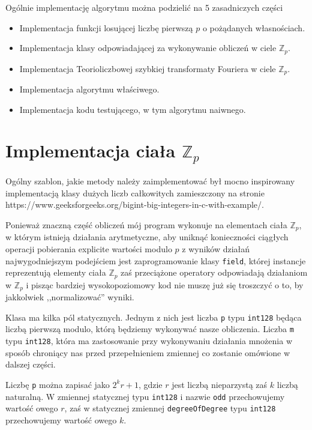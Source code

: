 \documentclass{article}
\begin{document}
Ogólnie implementację algorytmu można podzielić na 5 zasadniczych części
\begin{itemize}
  \item Implementacja funkcji losującej liczbę pierwszą $p$ o pożądanych własnościach.
  \item Implementacja klasy odpowiadającej za wykonywanie obliczeń w ciele $\mathbb{Z}_p$.
  \item Implementacja Teorioliczbowej szybkiej transformaty Fouriera w ciele $\mathbb{Z}_p$.
  \item Implementacja algorytmu właściwego.
  \item Implementacja kodu testującego, w tym algorytmu naiwnego.
\end{itemize}




\section{Implementacja ciała $ \mathbb{Z}_p$}

Ogólny szablon, jakie metody należy zaimplementować był 
mocno inspirowany implementacją klasy dużych liczb całkowitych
zamieszczony na stronie https://www.geeksforgeeks.org/bigint-big-integers-in-c-with-example/.


Ponieważ znaczną część obliczeń mój program wykonuje na elementach ciała
$\mathbb{Z}_p$, w którym istnieją działania arytmetyczne, aby uniknąć konieczności ciągłych operacji pobierania explicite
wartości modulo $p$ z wyników działań najwygodniejszym podejściem jest zaprogramowanie klasy \texttt{field}, której instancje
reprezentują elementy ciała $\mathbb{Z}_p$ zaś przeciążone operatory odpowiadają działaniom w $\mathbb{Z}_p$ i pisząc bardziej 
wysokopoziomowy kod nie muszę już się troszczyć o to, by jakkolwiek ,,normalizować'' wyniki. 


Klasa ma kilka pól statycznych. Jednym z nich jest liczba \texttt{p} typu \texttt{\textunderscore \textunderscore int128}
będąca liczbą pierwszą modulo, którą będziemy wykonywać nasze obliczenia. Liczba \texttt{m} typu 
\texttt{\textunderscore \textunderscore int128}, która ma zastosowanie przy wykonywaniu działania mnożenia w sposób
chroniący nas przed przepełnieniem zmiennej co zostanie omówione w dalszej części. 

Liczbę \texttt{p} można zapisać jako $2^kr+1$, gdzie $r$ jest liczbą nieparzystą zaś $k$ liczbą naturalną.
W zmiennej statycznej typu \texttt{\textunderscore \textunderscore int128} i nazwie \texttt{odd} przechowujemy
wartość owego $r$, zaś w statycznej zmiennej \texttt{degreeOfDegree} typu
\texttt{\textunderscore \textunderscore int128} przechowujemy wartość owego $k$.
\end{document}
